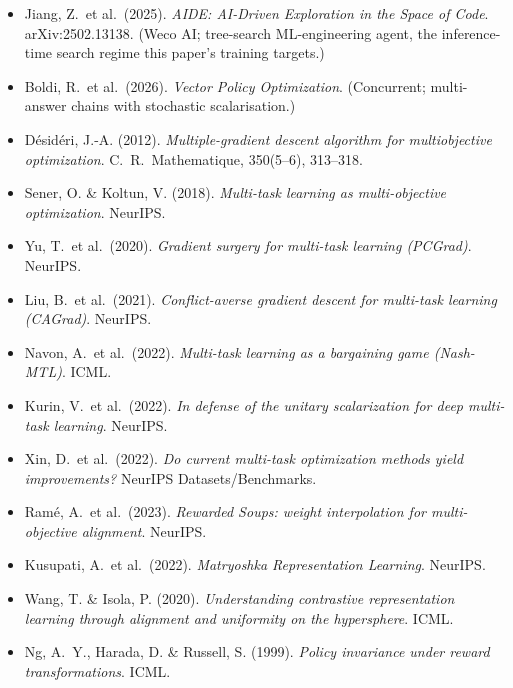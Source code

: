\documentclass[11pt,a4paper]{article}
\begin{document}
\begin{itemize}[nosep]
\item Jiang, Z.\ et al.\ (2025). \emph{AIDE: AI-Driven Exploration in the
  Space of Code}. arXiv:2502.13138. (Weco AI; tree-search ML-engineering agent,
  the inference-time search regime this paper's training targets.)
\item Boldi, R.\ et al.\ (2026). \emph{Vector Policy Optimization}.
  (Concurrent; multi-answer chains with stochastic scalarisation.)
\item D\'{e}sid\'{e}ri, J.-A. (2012). \emph{Multiple-gradient descent
  algorithm for multiobjective optimization}. C.\ R.\ Mathematique,
  350(5--6), 313--318.
\item Sener, O. \& Koltun, V. (2018). \emph{Multi-task learning as
  multi-objective optimization}. NeurIPS.
\item Yu, T.\ et al.\ (2020). \emph{Gradient surgery for multi-task learning
  (PCGrad)}. NeurIPS.
\item Liu, B.\ et al.\ (2021). \emph{Conflict-averse gradient descent for
  multi-task learning (CAGrad)}. NeurIPS.
\item Navon, A.\ et al.\ (2022). \emph{Multi-task learning as a bargaining
  game (Nash-MTL)}. ICML.
\item Kurin, V.\ et al.\ (2022). \emph{In defense of the unitary
  scalarization for deep multi-task learning}. NeurIPS.
\item Xin, D.\ et al.\ (2022). \emph{Do current multi-task optimization
  methods yield improvements?} NeurIPS Datasets/Benchmarks.
\item Ram\'e, A.\ et al.\ (2023). \emph{Rewarded Soups: weight interpolation
  for multi-objective alignment}. NeurIPS.
\item Kusupati, A.\ et al.\ (2022). \emph{Matryoshka Representation
  Learning}. NeurIPS.
\item Wang, T. \& Isola, P. (2020). \emph{Understanding contrastive
  representation learning through alignment and uniformity on the
  hypersphere}. ICML.
\item Ng, A.~Y., Harada, D. \& Russell, S. (1999). \emph{Policy invariance
  under reward transformations}. ICML.
\end{itemize}
\end{document}
